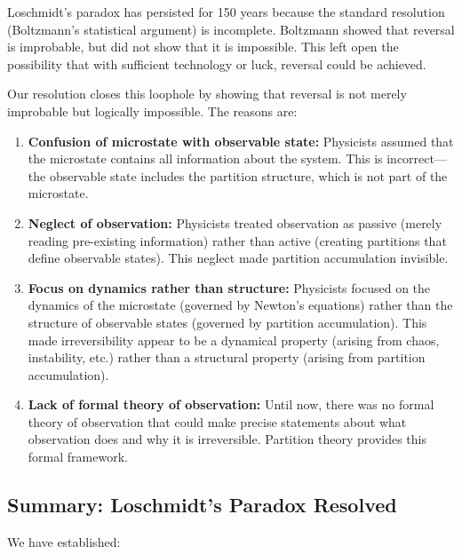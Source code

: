 \documentclass[twocolumn,10pt]{article}
\theoremstyle{definition}
\theoremstyle{remark}
\begin{document}
Loschmidt's paradox has persisted for 150 years because the standard resolution (Boltzmann's statistical argument) is incomplete. Boltzmann showed that reversal is improbable, but did not show that it is impossible. This left open the possibility that with sufficient technology or luck, reversal could be achieved.

\vspace{0.2cm}
\noindent Our resolution closes this loophole by showing that reversal is not merely improbable but logically impossible. The reasons are:

\begin{enumerate}
\item \textbf{Confusion of microstate with observable state:} Physicists assumed that the microstate contains all information about the system. This is incorrect—the observable state includes the partition structure, which is not part of the microstate.

\item \textbf{Neglect of observation:} Physicists treated observation as passive (merely reading pre-existing information) rather than active (creating partitions that define observable states). This neglect made partition accumulation invisible.

\item \textbf{Focus on dynamics rather than structure:} Physicists focused on the dynamics of the microstate (governed by Newton's equations) rather than the structure of observable states (governed by partition accumulation). This made irreversibility appear to be a dynamical property (arising from chaos, instability, etc.) rather than a structural property (arising from partition accumulation).

\item \textbf{Lack of formal theory of observation:} Until now, there was no formal theory of observation that could make precise statements about what observation does and why it is irreversible. Partition theory provides this formal framework.
\end{enumerate}

\subsection{Summary: Loschmidt's Paradox Resolved}

We have established:
\end{document}
